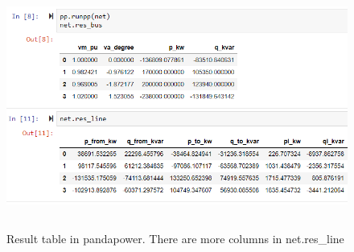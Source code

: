 \documentclass[class=book, crop=false]{standalone}
\begin{document}
\begin{figure}[H]
    \includegraphics[height=8cm, width=14cm]{figures/case4g_line_bus_res.PNG}
    \caption[size = 9]{Result table in pandapower. There are more columns in net.res_line}
    \label{fig:method:res_line_bus_dataframe}
\end{figure}
\end{document}

